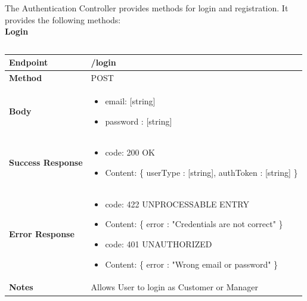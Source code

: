\documentclass[a4paper, 12pt, oneside, table]{article}
\begin{document}
The Authentication Controller provides methods for login and registration.
It provides the following methods:
\\

\textbf{Login}
\vspace{-2em}
\begin{tabularx}{0.8\textwidth} { 
  | >{\raggedright\arraybackslash}X 
  | >{\centering\arraybackslash}X 
  | >{\raggedleft\arraybackslash}X | }
 \hline

 \hline
 
\hline
\hline
 
\hline
\end{tabularx}

\begin{tabularx}{\linewidth}{| l | X |}
    
    \hline
     \textbf{Endpoint} & /login \\
    

    \hline
    \textbf{Method}  & POST   \\
    
    \hline
    \textbf{Body}  & \parbox{0.7\textwidth}{ \begin{itemize}[label={}] 
                \item email: [string]
                 \item password : [string]
               \end{itemize}}\\
    
    \hline
    \textbf{Success Response} & \parbox{0.7\textwidth}{ \begin{itemize}[label={}] 
                \item code: 200 OK
                 \item Content: \{ userType : [string], authToken : [string] \}
               \end{itemize}}\\
    
    \hline
    
    \hline
        \textbf{Error Response} & \parbox{0.7\textwidth}{ \begin{itemize}[label={}] 
                \item code: 422 UNPROCESSABLE ENTRY
                 \item Content: \{ error : "Credentials are not correct" \}
                  \item code: 401 UNAUTHORIZED
                 \item Content: \{ error : "Wrong email or password" \}
               \end{itemize}}\\
    
    \hline
    \textbf{Notes} & Allows User to login as Customer or Manager \\

    \hline
    
\end{tabularx}
\end{document}
